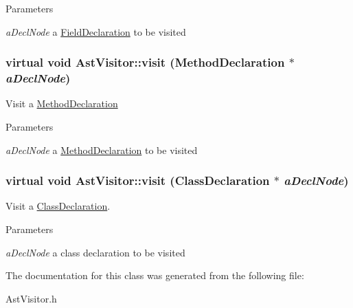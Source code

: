 \begin{DoxyParams}{Parameters}
\item[{\em aDeclNode}]a \hyperlink{classFieldDeclaration}{FieldDeclaration} to be visited \end{DoxyParams}
\hypertarget{classAstVisitor_ab9d4c10a46ea5252fb90a76f347852af}{
\subsubsection[{visit}]{\setlength{\rightskip}{0pt plus 5cm}virtual void AstVisitor::visit ({\bf MethodDeclaration} $\ast$ {\em aDeclNode})}}
\label{classAstVisitor_ab9d4c10a46ea5252fb90a76f347852af}
Visit a \hyperlink{classMethodDeclaration}{MethodDeclaration}


\begin{DoxyParams}{Parameters}
\item[{\em aDeclNode}]a \hyperlink{classMethodDeclaration}{MethodDeclaration} to be visited \end{DoxyParams}
\hypertarget{classAstVisitor_ae922c774d8e8e3fbb9a81a229ef00ecb}{
\subsubsection[{visit}]{\setlength{\rightskip}{0pt plus 5cm}virtual void AstVisitor::visit ({\bf ClassDeclaration} $\ast$ {\em aDeclNode})}}
\label{classAstVisitor_ae922c774d8e8e3fbb9a81a229ef00ecb}
Visit a \hyperlink{classClassDeclaration}{ClassDeclaration}.


\begin{DoxyParams}{Parameters}
\item[{\em aDeclNode}]a class declaration to be visited \end{DoxyParams}


The documentation for this class was generated from the following file:\begin{DoxyCompactItemize}
\item 
AstVisitor.h\end{DoxyCompactItemize}

